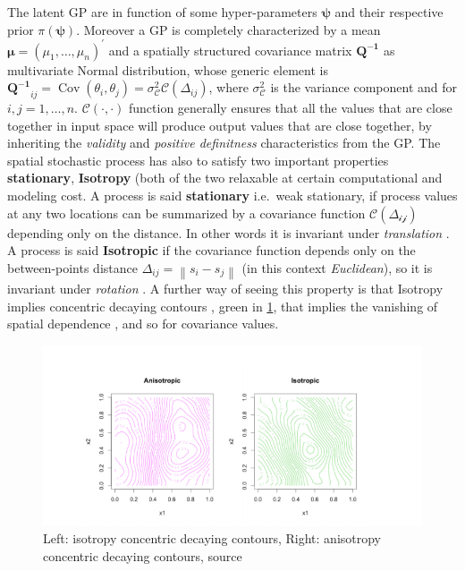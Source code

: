 \documentclass[
  12pt,
  a4paper,
  oneside]{book}
\theoremstyle{definition}
\theoremstyle{definition}
\theoremstyle{definition}
\theoremstyle{remark}
\begin{document}
The latent GP are in function of some hyper-parameters \(\boldsymbol\psi\) and their respective prior \(\pi(\boldsymbol\psi)\). Moreover a GP is completely characterized by a mean \(\boldsymbol{\mu}=\left(\mu_{1}, \ldots, \mu_{n}\right)^{\prime}\) and a spatially structured covariance matrix \(\boldsymbol{Q^{-1}}\) as multivariate Normal distribution, whose generic element is \(\boldsymbol{Q^{-1}}_{i j}=\operatorname{Cov}(\theta_{i}, \theta_{j})=\sigma^2_{\mathscr{C}} \mathscr{C}(\Delta_{i j})\), where \(\sigma_{\mathscr{C}}^{2}\) is the variance component and for \(i, j = 1, \ldots, n\). \(\mathscr{C}\left( \cdot, \cdot \right)\) function generally ensures that all the values that are close together in input space will produce output values that are close together, by inheriting the \emph{validity} and \emph{positive definitness} characteristics from the GP. The spatial stochastic process has also to satisfy two important properties \textbf{stationary}, \textbf{Isotropy} (both of the two relaxable at certain computational and modeling cost.
A process is said \textbf{stationary} i.e.~weak stationary, if process values at any two locations can be summarized by a covariance function \(\mathscr{C(\Delta_{i j})}\) depending only on the distance. In other words it is invariant under \emph{translation} \citep{Krainski-Rubio}.
A process is said \textbf{Isotropic} if the covariance function depends only on the between-points distance \(\Delta_{i j}=\left\|s_{i}-s_{j}\right\|\) (in this context \emph{Euclidean}), so it is invariant under \emph{rotation} \citeyearpar{Krainski-Rubio}. A further way of seeing this property is that Isotropy implies concentric decaying contours \citep{LecturePaci}, green in \ref{fig:isoovsanis}, that implies the vanishing of spatial dependence \citep{Blangiardo-Cameletti}, and so for covariance values.

\begin{figure}
\centering
\includegraphics{images/isotropyVSanisotropy.png}
\caption{\label{fig:isoovsanis}Left: isotropy concentric decaying contours, Right: anisotropy concentric decaying contours, source \citet{blanchetscalliet}}
\end{figure}
\end{document}
